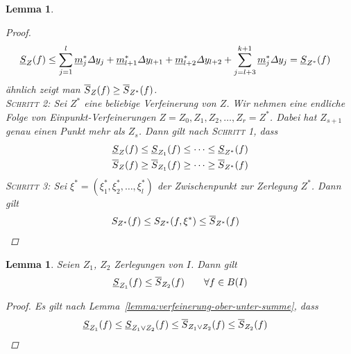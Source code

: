 \documentclass[11pt, twoside, a4paper]{article}
\theoremstyle{plain}
\newtheorem{lemma}[blockelement]{Lemma}
\newcommand{\pair}[1]{\left(#1\right)}
\newcommand{\of}[1]{\mathopen{}\mathclose{}\bgroup\left(#1\aftergroup\egroup\right)}
\begin{document}
\begin{lemma}
\begin{proof}
\begin{align*}
                \underline{S}_{Z}\of{f} &\leq \sum_{j=1}^{l} \underline{m}_j^{*} \varDelta y_j + \underline{m}_{l+1}^{*} \varDelta y_{l+1} + \underline{m}_{l+2}^{*}\varDelta y_{l+2} + \sum_{j=l+3}^{k+1} \underline{m}_j^{*}\varDelta y_j = \underline{S}_{Z^{*}}\of{f}
            \end{align*}
            ähnlich zeigt man $\overline{S}_Z\of{f} \geq \overline{S}_{Z^{*}}\of{f}$.\\[10pt]
            \textsc{Schritt 2:} Sei $Z^{*}$ eine beliebige Verfeinerung von $Z$. Wir nehmen eine endliche Folge von Einpunkt-Verfeinerungen $Z=Z_0, Z_1, Z_2, \dots, Z_r = Z^{*}$. Dabei hat $Z_{s+1}$ genau einen Punkt mehr als $Z_{s}$. Dann gilt nach \textsc{Schritt 1}, dass
            \begin{align*}
                \underline{S}_{Z}\of{f} &\leq \underline{S}_{Z_1}\of{f} \leq \dots \leq \underline{S}_{Z^{*}}\of{f}\\
                \overline{S}_{Z}\of{f} &\geq \overline{S}_{Z_1}\of{f} \geq \dots \geq \overline{S}_{Z^{*}}\of{f}
            \end{align*}
            \textsc{Schritt 3:} Sei $\xi^{*} = \pair{\xi_1^{*}, \xi_2^{*}, \dots, \xi_l^{*}}$ der Zwischenpunkt zur Zerlegung $Z^{*}$. Dann gilt
            \begin{align*}
                S_{Z^{*}}\of{f} \leq S_{Z^*}\of{f, \xi^{*}} &\leq \overline{S}_{Z^*}\of{f}\qedhere
            \end{align*}
        \end{proof}
    \end{lemma}

    \begin{lemma} %
        \label{lemma:ober-unter-summe-zerlegung}
        Seien $Z_1$, $Z_2$ Zerlegungen von $I$. Dann gilt
        \begin{align*}
            \underline{S}_{Z_1}\of{f} \leq \overline{S}_{Z_2}\of{f}\qquad\forall f\in B\of{I}
        \end{align*}
        \begin{proof}
            Es gilt nach Lemma~\ref{lemma:verfeinerung-ober-unter-summe}, dass
            \begin{align*}
                \underline{S}_{Z_1}\of{f} &\leq \underline{S}_{Z_1\lor Z_2}\of{f}\leq \overline{S}_{Z_1\lor Z_2}\of{f} \leq \overline{S}_{Z_2}\of{f}\qedhere
            \end{align*}
        \end{proof}
    \end{lemma}
\end{document}

